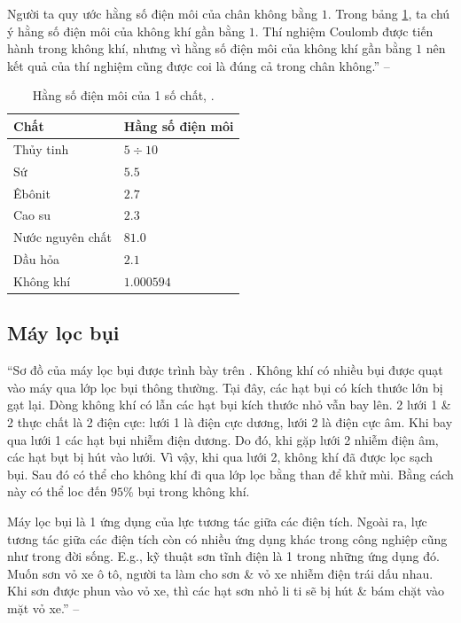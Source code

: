 \documentclass[oneside]{book}
\numberwithin{equation}{section}
\begin{document}
Người ta quy ước hằng số điện môi của chân không bằng $1$. Trong bảng \ref{tab:hang so dien moi}, ta chú ý hằng số điện môi của không khí gần bằng $1$. Thí nghiệm Coulomb được tiến hành trong không khí, nhưng vì hằng số điện môi của không khí gần bằng $1$ nên kết quả của thí nghiệm cũng được coi là đúng cả trong chân không.'' -- \cite[p. 8]{SGK_Vat_Ly_11_nang_cao}

\begin{table}[H]
	\centering
	\begin{tabular}{|l|l|}
		\hline
		\textbf{Chất} & \textbf{Hằng số điện môi} \\
		\hline
		Thủy tinh & $5\div 10$ \\
		\hline
		Sứ & $5.5$ \\
		\hline
		Êbônit & $2.7$ \\
		\hline
		Cao su & $2.3$ \\
		\hline
		Nước nguyên chất & $81.0$ \\
		\hline
		Dầu hỏa & $2.1$ \\
		\hline
		Không khí & $1.000594$ \\
		\hline
	\end{tabular}
	\caption{Hằng số điện môi của 1 số chất, \cite[Bảng 1.1, p. 8]{SGK_Vat_Ly_11_nang_cao}.}
	\label{tab:hang so dien moi}
\end{table}

\subsection{Máy lọc bụi}
``Sơ đồ của máy lọc bụi được trình bày trên \cite[Hình 1.8, p. 9]{SGK_Vat_Ly_11_nang_cao}. Không khí có nhiều bụi được quạt vào máy qua lớp lọc bụi thông thường. Tại đây, các hạt bụi có kích thước lớn bị gạt lại. Dòng không khí có lẫn các hạt bụi kích thước nhỏ vẫn bay lên. 2 lưới 1 \& 2 thực chất là 2 điện cực: lưới 1 là điện cực dương, lưới 2 là điện cực âm. Khi bay qua lưới 1 các hạt bụi nhiễm điện dương. Do đó, khi gặp lưới 2 nhiễm điện âm, các hạt bụt bị hút vào lưới. Vì vậy, khi qua lưới 2, không khí đã được lọc sạch bụi. Sau đó có thể cho không khí đi qua lớp lọc bằng than để khử mùi. Bằng cách này có thể loc đến $95\%$ bụi trong không khí.

Máy lọc bụi là 1 ứng dụng của lực tương tác giữa các điện tích. Ngoài ra, lực tương tác giữa các điện tích còn có nhiều ứng dụng khác trong công nghiệp cũng như trong đời sống. E.g., kỹ thuật sơn tĩnh điện là 1 trong những ứng dụng đó. Muốn sơn vỏ xe ô tô, người ta làm cho sơn \& vỏ xe nhiễm điện trái dấu nhau. Khi sơn được phun vào vỏ xe, thì các hạt sơn nhỏ li ti sẽ bị hút \& bám chặt vào mặt vỏ xe.'' -- \cite[p. 9]{SGK_Vat_Ly_11_nang_cao}
\end{document}

